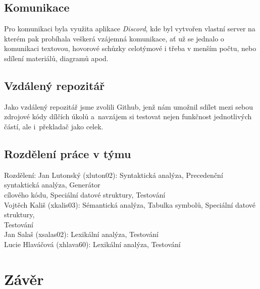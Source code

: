 \documentclass[a4paper, 11pt]{article}
\begin{document}
	\subsection{Komunikace}
	Pro komunikaci byla využita aplikace \textit{Discord}, kde byl vytvořen vlastní server na kterém pak probíhala veškerá vzájemná komunikace, ať už se 
	jednalo o komunikaci textovou, hovorové schůzky celotýmové i třeba v menším počtu, nebo sdílení materiálů, diagramů apod. 
	\subsection{Vzdálený repozitář}
	Jako vzdálený repozitář jsme zvolili Github, jenž nám umožnil sdílet mezi sebou zdrojové kódy dílčích úkolů a~navzájem si testovat nejen funkčnost 
	jednotlivých částí, ale i~překladač jako celek.
	\subsection{Rozdělení práce v týmu}
	Rozdělení: \hspace*{0.5cm} 	Jan Lutonský (xluton02): \hspace{0.1cm} Syntaktická analýza, Precedenční syntaktická analýza, Generátor \\
			\hspace*{5cm} cílového kódu, Speciální datové struktury, Testování\\
			\hspace*{2.25cm}	Vojtěch Kališ (xkalis03): \hspace{0.1cm} Sémantická analýza, Tabulka symbolů, Speciální datové struktury, \\
			\hspace*{5cm} Testování\\
			\hspace*{2.25cm}	Jan Salaš (xsalas02): \hspace{0.1cm} Lexikální analýza, Testování\\
			\hspace*{2.25cm}	Lucie Hlaváčová (xhlava60): \hspace{0.1cm} Lexikální analýza, Testování\\
	\section{Závěr}
	
	\newpage
	
	\begingroup\centering
\end{document}

